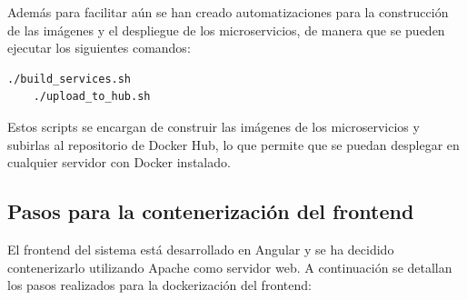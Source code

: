 Además para facilitar aún se han creado automatizaciones para la construcción de las imágenes y el despliegue de los microservicios, de manera que se pueden ejecutar los siguientes comandos:
\begin{lstlisting}[language=bash]
    ./build_services.sh 
    ./upload_to_hub.sh
\end{lstlisting}

Estos scripts se encargan de construir las imágenes de los microservicios y subirlas al repositorio de Docker Hub, lo que permite que se puedan desplegar en cualquier servidor con Docker instalado.

\subsection{Pasos para la contenerización del frontend}

El frontend del sistema está desarrollado en Angular y se ha decidido contenerizarlo utilizando Apache como servidor web. A continuación se detallan los pasos realizados para la dockerización del frontend:

